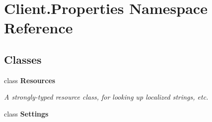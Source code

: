 \hypertarget{namespace_client_1_1_properties}{}\section{Client.\+Properties Namespace Reference}
\label{namespace_client_1_1_properties}
\subsection*{Classes}
\begin{DoxyCompactItemize}
\item 
class {\bfseries Resources}
\begin{DoxyCompactList}\small\item\em A strongly-\/typed resource class, for looking up localized strings, etc. \end{DoxyCompactList}\item 
class {\bfseries Settings}
\end{DoxyCompactItemize}
